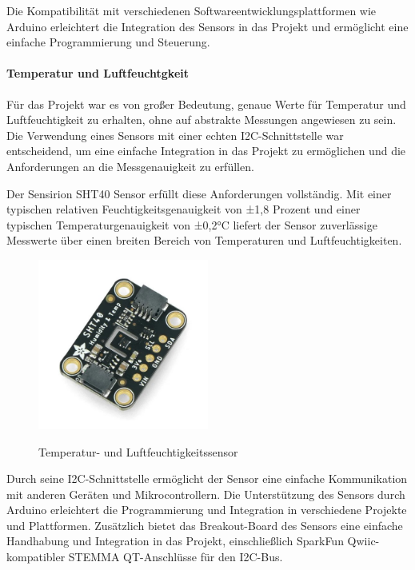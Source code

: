 Die Kompatibilität mit verschiedenen Softwareentwicklungsplattformen wie Arduino erleichtert die Integration des Sensors in das Projekt und ermöglicht eine einfache Programmierung und Steuerung.

\paragraph{Temperatur und Luftfeuchtgkeit}
Für das Projekt war es von großer Bedeutung, genaue Werte für Temperatur und Luftfeuchtigkeit zu erhalten, ohne auf abstrakte Messungen angewiesen zu sein. Die Verwendung eines Sensors mit einer echten I2C-Schnittstelle war entscheidend, um eine einfache Integration in das Projekt zu ermöglichen und die Anforderungen an die Messgenauigkeit zu erfüllen.

Der Sensirion SHT40 Sensor erfüllt diese Anforderungen vollständig. Mit einer typischen relativen Feuchtigkeitsgenauigkeit von ±1,8 Prozent und einer typischen Temperaturgenauigkeit von ±0,2°C liefert der Sensor zuverlässige Messwerte über einen breiten Bereich von Temperaturen und Luftfeuchtigkeiten. \cite{adafruit-sht40}

\begin{figure}[H]
\centering
\includegraphics[width=0.5\textwidth]{images/TempSensor.jpg}
\caption{Temperatur- und Luftfeuchtigkeitssensor}\cite{rainpoint_smart_timer}
\label{fig:rainpointDiagram}
\end{figure}

Durch seine I2C-Schnittstelle ermöglicht der Sensor eine einfache Kommunikation mit anderen Geräten und Mikrocontrollern. Die Unterstützung des Sensors durch Arduino erleichtert die Programmierung und Integration in verschiedene Projekte und Plattformen. Zusätzlich bietet das Breakout-Board des Sensors eine einfache Handhabung und Integration in das Projekt, einschließlich SparkFun Qwiic-kompatibler STEMMA QT-Anschlüsse für den I2C-Bus.


